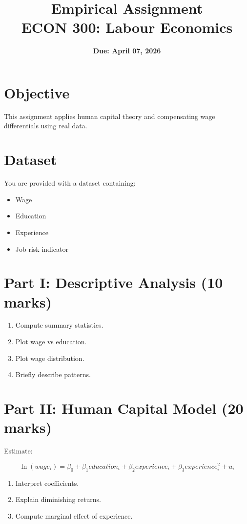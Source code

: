 \documentclass[12pt]{article}
\begin{document}
\title{\textbf{Empirical Assignment}\\
ECON 300: Labour Economics}
\date{\textbf{Due: April 07,  2026}}
\maketitle

\section*{Objective}

This assignment applies human capital theory and compensating wage differentials using real data.

\section*{Dataset}

You are provided with a dataset containing:
\begin{itemize}
    \item Wage
    \item Education
    \item Experience
    \item Job risk indicator
\end{itemize}

\section*{Part I: Descriptive Analysis (10 marks)}

\begin{enumerate}
    \item Compute summary statistics.
    \item Plot wage vs education.
    \item Plot wage distribution.
    \item Briefly describe patterns.
\end{enumerate}

\section*{Part II: Human Capital Model (20 marks)}

Estimate:

\[
\ln(wage_i) = \beta_0 + \beta_1 education_i + \beta_2 experience_i + \beta_3 experience_i^2 + u_i
\]

\begin{enumerate}
    \item Interpret coefficients.
    \item Explain diminishing returns.
    \item Compute marginal effect of experience.
\end{enumerate}
\end{document}
